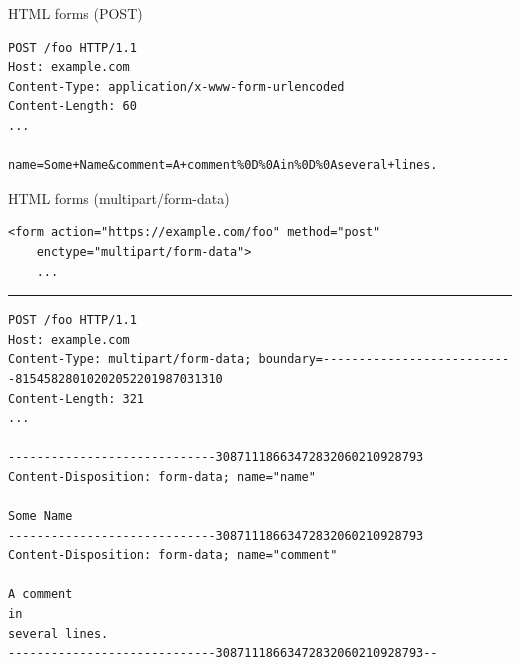 \begin{frame}[fragile]{HTML forms (POST)}
\begin{Verbatim}[fontsize=\small]
POST /foo HTTP/1.1
Host: example.com
Content-Type: application/x-www-form-urlencoded
Content-Length: 60
...

name=Some+Name&comment=A+comment%0D%0Ain%0D%0Aseveral+lines.
\end{Verbatim}
\end{frame}

\begin{frame}[fragile]{HTML forms (multipart/form-data)}
\begin{Verbatim}[fontsize=\fontsize{9}{10}]
<form action="https://example.com/foo" method="post"
    enctype="multipart/form-data">
    ...
\end{Verbatim}
\rule{0.9\textwidth}{1mm}
\begin{Verbatim}[fontsize=\fontsize{9}{10}]
POST /foo HTTP/1.1
Host: example.com
Content-Type: multipart/form-data; boundary=---------------------------81545828010202052201987031310
Content-Length: 321
...

-----------------------------30871118663472832060210928793
Content-Disposition: form-data; name="name"

Some Name
-----------------------------30871118663472832060210928793
Content-Disposition: form-data; name="comment"

A comment
in
several lines.
-----------------------------30871118663472832060210928793--
\end{Verbatim}
\end{frame}

